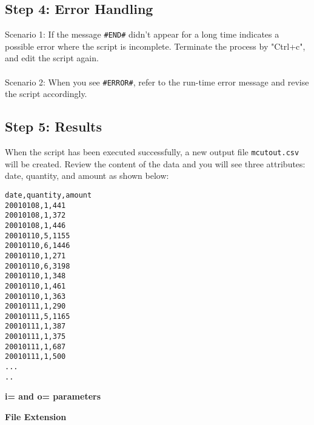 \subsection{Step 4: Error Handling }

Scenario 1:  If the message \verb|#END#| didn't appear for a long time indicates a possible error where the script is incomplete. Terminate the process by "Ctrl+c", and edit the script again.\\
\\Scenario 2: When you see \verb|#ERROR#|, refer to the run-time error message and revise the script accordingly. \\

\subsection{Step 5: Results }

When the script has been executed successfully, a new output file \verb|mcutout.csv| will be created. Review the content of the data and you will see three attributes: date, quantity, and amount as shown below: 

\begin{verbatim}
date,quantity,amount
20010108,1,441
20010108,1,372
20010108,1,446
20010110,5,1155
20010110,6,1446
20010110,1,271
20010110,6,3198
20010110,1,348
20010110,1,461
20010110,1,363
20010111,1,290
20010111,5,1165
20010111,1,387
20010111,1,375
20010111,1,687
20010111,1,500
...
..
\end{verbatim}

\vspace {5mm}

{\setlength{\parindent}{0cm}
\textbf{i= and o= parameters}\\


\vspace {5mm}

\textbf{File Extension}\\

}

